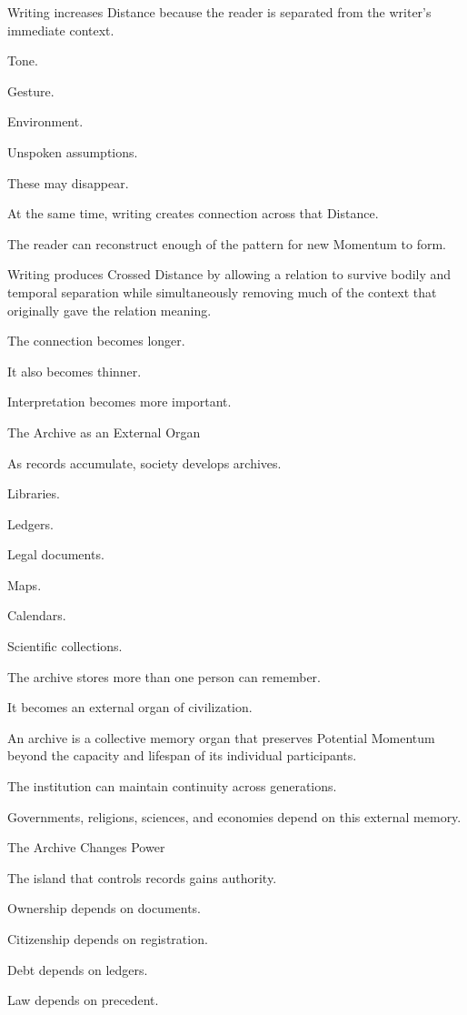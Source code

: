 Writing increases Distance because the reader is separated from the writer’s immediate context.

Tone.

Gesture.

Environment.

Unspoken assumptions.

These may disappear.

At the same time, writing creates connection across that Distance.

The reader can reconstruct enough of the pattern for new Momentum to form.

Writing produces Crossed Distance by allowing a relation to survive bodily and temporal separation while simultaneously removing much of the context that originally gave the relation meaning.

The connection becomes longer.

It also becomes thinner.

Interpretation becomes more important.

The Archive as an External Organ

As records accumulate, society develops archives.

Libraries.

Ledgers.

Legal documents.

Maps.

Calendars.

Scientific collections.

The archive stores more than one person can remember.

It becomes an external organ of civilization.

An archive is a collective memory organ that preserves Potential Momentum beyond the capacity and lifespan of its individual participants.

The institution can maintain continuity across generations.

Governments, religions, sciences, and economies depend on this external memory.

The Archive Changes Power

The island that controls records gains authority.

Ownership depends on documents.

Citizenship depends on registration.

Debt depends on ledgers.

Law depends on precedent.

